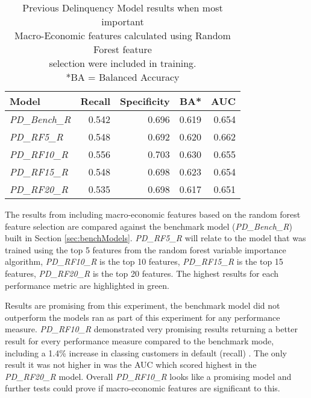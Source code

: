 \begin{table}[H]
\centering
\small
		\begin{tabular}{l r r r r}
			\hline
			\textbf{Model} & \textbf{Recall} & \textbf{Specificity} & \textbf{BA*} & \textbf{AUC}  \\ \hline
			\textit{PD\_Bench\_R} & 0.542 & 0.696 & 0.619 & 0.654 \\ \hline
			\textit{PD\_RF5\_R} & 0.548 & 0.692 & 0.620 & \cellcolor{green!25}0.662   \\ 
			\textit{PD\_RF10\_R} & \cellcolor{green!25}0.556 & \cellcolor{green!25}0.703 & \cellcolor{green!25}0.630 & 0.655  \\ 
			\textit{PD\_RF15\_R} & 0.548 & 0.698 & 0.623 & 0.654  \\
			\textit{PD\_RF20\_R} & 0.535 & 0.698 & 0.617 & 0.651  \\\hline 
		\end{tabular}

	\caption{Previous Delinquency Model results when most important\\
Macro-Economic features calculated using Random Forest feature \\selection were included in training.
\\ *BA = Balanced Accuracy}
	\label{table:RFPDModelResults}
\end{table}

The results from including macro-economic features based on the random forest feature selection are compared against the benchmark model (\textit{PD\_Bench\_R}) built in Section \ref{sec:benchModels}. \textit{PD\_RF5\_R} will relate to the model that was trained using the top 5 features from the random forest variable importance algorithm, \textit{PD\_RF10\_R} is the top 10 features, \textit{PD\_RF15\_R} is the top 15 features, \textit{PD\_RF20\_R} is the top 20 features. The highest results for each performance metric are highlighted in green.

Results are promising from this experiment, the benchmark model did not outperform the models ran as part of this experiment for any performance measure. \textit{PD\_RF10\_R} demonstrated  very promising results returning a better result for every performance measure compared to the benchmark mode, including a 1.4\% increase in classing customers in default (recall) . The only result it was not higher in was the AUC which scored highest in the \textit{PD\_RF20\_R} model. Overall \textit{PD\_RF10\_R} looks like a promising model and further tests could prove if macro-economic features are significant to this.

